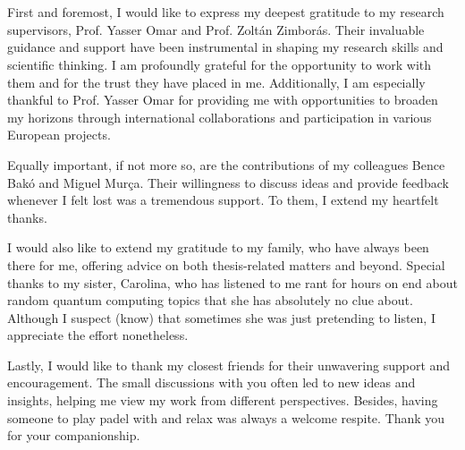 
\section*{\acknowledgments}\label{sec:acknowledgments}



First and foremost, I would like to express my deepest gratitude to my research supervisors, Prof. Yasser Omar and Prof. Zoltán Zimborás. Their invaluable guidance and support have been instrumental in shaping my research skills and scientific thinking. I am profoundly grateful for the opportunity to work with them and for the trust they have placed in me. Additionally, I am especially thankful to Prof. Yasser Omar for providing me with opportunities to broaden my horizons through international collaborations and participation in various European projects.

Equally important, if not more so, are the contributions of my colleagues Bence Bakó and Miguel Murça. Their willingness to discuss ideas and provide feedback whenever I felt lost was a tremendous support. To them, I extend my heartfelt thanks.

I would also like to extend my gratitude to my family, who have always been there for me, offering advice on both thesis-related matters and beyond.  Special thanks to my sister, Carolina, who has listened to me rant for hours on end about random quantum computing topics that she has absolutely no clue about. Although I suspect (know) that sometimes she was just pretending to listen, I appreciate the effort nonetheless.

Lastly, I would like to thank my closest friends for their unwavering support and encouragement. The small discussions with you often led to new ideas and insights, helping me view my work from different perspectives. Besides, having someone to play padel with and relax was always a welcome respite. Thank you for your companionship.

